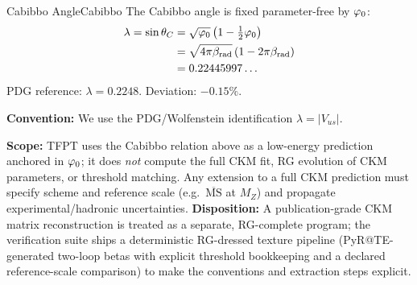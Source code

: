 \begin{corollary}{Cabibbo Angle}{Cabibbo}
The Cabibbo angle is fixed parameter-free by $\varphi_0$:
\begin{equation}
    \begin{aligned}
        \lambda = \sin\theta_C 
        &= \sqrt{\varphi_0}\left(1 - \tfrac{1}{2}\varphi_0\right) \\
        &= \sqrt{4\pi\beta_{\text{rad}}}\left(1 - 2\pi\beta_{\text{rad}}\right) \\
        &= 0.22445997\ldots
    \end{aligned}
\end{equation}
PDG reference: $\lambda = 0.2248$. Deviation: $-0.15\%$.
\end{corollary}

\begin{tcolorbox}[colback=gray!5, colframe=gray!60, 
    title={\textbf{CKM Conventions and Scale (Clarification)}}, fonttitle=\bfseries\small]
\textbf{Convention:} We use the PDG/Wolfenstein identification $\lambda = |V_{us}|$.

\textbf{Scope:} TFPT uses the Cabibbo relation above as a low-energy prediction anchored in $\varphi_0$; it does \emph{not} compute the full CKM fit, RG evolution of CKM parameters, or threshold matching.
Any extension to a full CKM prediction must specify scheme and reference scale (e.g.\ $\overline{\mathrm{MS}}$ at $M_Z$) and propagate experimental/hadronic uncertainties.
\textbf{Disposition:} A publication-grade CKM matrix reconstruction is treated as a separate, RG-complete program; the verification suite ships a deterministic RG-dressed texture pipeline (PyR@TE-generated two-loop betas with explicit threshold bookkeeping and a declared reference-scale comparison) to make the conventions and extraction steps explicit.
\end{tcolorbox}

